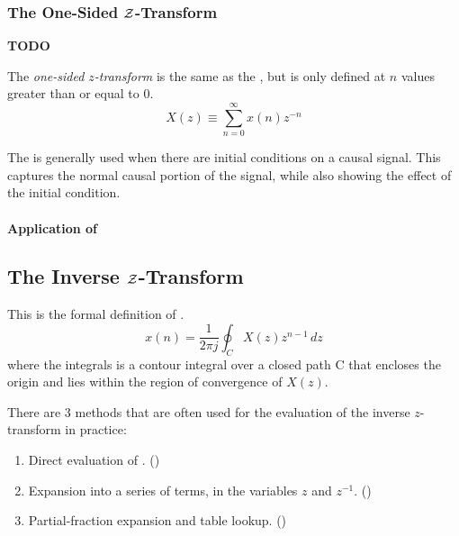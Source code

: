 \subsubsection{The One-Sided \texorpdfstring{$\operatorname{\mathcal{Z}}$-Transform}{Z-Transform}}\label{subsubsec:One-Sided Z-Transform}
\textbf{TODO}
\begin{definition}\label{def:One-Sided Z-Transform}
  The \emph{one-sided $z$-transform} is the same as the , but is only defined at $n$ values greater than or equal to 0.
  \begin{equation}\label{eq:One-Sided Z-Transform}
    X(z) \equiv \sum_{n=0}^{\infty} x(n)z^{-n}
  \end{equation}
\end{definition}

The  is generally used when there are initial conditions on a causal signal.
This captures the normal causal portion of the signal, while also showing the effect of the initial condition.

\paragraph{Application of }\label{par:Application_One_Sided_Z_Transform}


\subsection{The Inverse \texorpdfstring{$\operatorname{\mathcal{Z}}$-Transform}{Z-Transform}}\label{subsec:Inverse Z-Transform}
This is the formal definition of .
\begin{equation}\label{eq:Inverse Z-Transform}
  x(n) = \frac{1}{2 \pi j} \oint_{C} X(z) z^{n-1} \, dz
\end{equation}
where the integrals is a contour integral over a closed path C that encloses the origin and lies within the region of convergence of $X(z)$.

There are 3 methods that are often used for the evaluation of the inverse $z$-transform in practice:
\begin{enumerate}[noitemsep]
\item Direct evaluation of . ()
\item Expansion into a series of terms, in the variables $z$ and $z^{-1}$. ()
\item Partial-fraction expansion and table lookup. ()
\end{enumerate}

